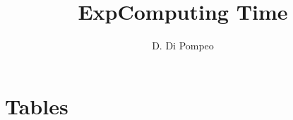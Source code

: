 \documentclass{article}
\title{ExpComputing Time}
\author{D. Di Pompeo}
\begin{document}
\maketitle
\section{Tables}
\end{document}
